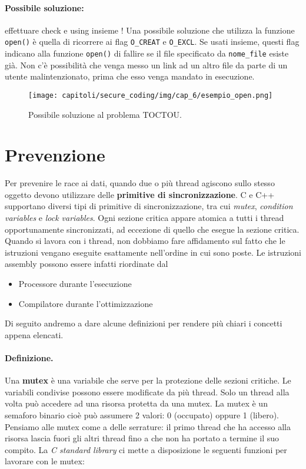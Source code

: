\paragraph{Possibile soluzione:}
effettuare check e using insieme !
Una possibile soluzione che utilizza la funzione
\verb|open()| è quella di ricorrere ai flag \verb|O_CREAT| e \verb|O_EXCL|.
Se usati insieme, questi flag indicano alla funzione \verb|open()| di fallire
se il file specificato da \verb|nome_file| esiste già.
Non c'è possibilità che venga messo un link ad un altro file da parte di un
utente malintenzionato, prima che esso venga mandato in esecuzione.

\begin{figure}
    \centering
    \texttt{[image: capitoli/secure\_coding/img/cap\_6/esempio\_open.png]}
    \caption{Possibile soluzione al problema TOCTOU.}
\end{figure}

\section{Prevenzione}

Per prevenire le race ai dati, quando due o più thread agiscono sullo stesso
oggetto devono utilizzare delle \textbf{primitive di sincronizzazione}.
C e C++ supportano diversi tipi di primitive di sincronizzazione, tra cui \textit{mutex},
\textit{condition variables} e \textit{lock variables}.
Ogni sezione critica appare atomica a tutti i thread opportunamente sincronizzati,
ad eccezione di quello che esegue la sezione critica.
Quando si lavora con i thread, non dobbiamo fare affidamento sul fatto che le istruzioni
vengano eseguite
esattamente nell'ordine in cui sono poste.
Le istruzioni assembly possono essere infatti riordinate dal

\begin{itemize}
    \item Processore durante l'esecuzione
    \item Compilatore durante l'ottimizzazione
\end{itemize}

Di seguito andremo a dare alcune definizioni per rendere più chiari i concetti appena elencati.

\paragraph{Definizione.}
Una \textbf{mutex} è una variabile che serve per la protezione delle sezioni critiche.
Le variabili condivise possono essere modificate da più thread.
Solo un thread alla volta può accedere ad una risorsa protetta da una mutex.
La mutex è un semaforo binario cioè può assumere 2 valori: 0 (occupato)
oppure 1 (libero).
Pensiamo alle mutex come a delle serrature:
il primo thread che ha accesso alla risorsa lascia fuori gli altri thread
fino a che non ha portato a termine il suo compito. La \textit{C standard library}
ci mette a disposizione le seguenti funzioni per lavorare con le mutex:

